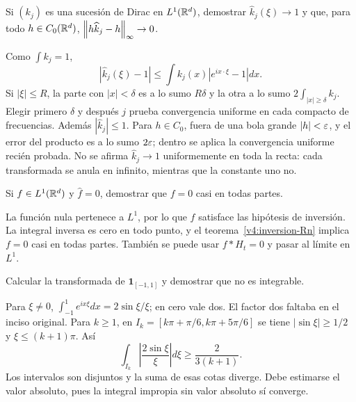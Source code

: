 \begin{ejercicio}\label{ej:v4-l10-3}
Si $(k_j)$ es una sucesión de Dirac en $L^1(\mathbb R^d)$, demostrar $\widehat k_j(\xi)\to1$ y que, para todo $h\in C_0(\mathbb R^d)$, $\left\lVert h\widehat k_j-h\right\rVert_\infty\to0$.
\end{ejercicio}
\begin{solucion}
Como $\int k_j=1$,
\[
 |\widehat k_j(\xi)-1|\leq\int k_j(x)|e^{ix\cdot\xi}-1|dx.
\]
Si $|\xi|\leq R$, la parte con $|x|<\delta$ es a lo sumo $R\delta$ y la otra a lo sumo $2\int_{|x|\geq\delta}k_j$. Elegir primero $\delta$ y después $j$ prueba convergencia uniforme en cada compacto de frecuencias. Además $|\widehat k_j|\leq1$. Para $h\in C_0$, fuera de una bola grande $|h|<\varepsilon$, y el error del producto es a lo sumo $2\varepsilon$; dentro se aplica la convergencia uniforme recién probada. No se afirma $\widehat k_j\to1$ uniformemente en toda la recta: cada transformada se anula en infinito, mientras que la constante uno no.
\end{solucion}

\begin{ejercicio}\label{ej:v4-l11-1}
Si $f\in L^1(\mathbb R^d)$ y $\widehat f=0$, demostrar que $f=0$ casi en todas partes.
\end{ejercicio}
\begin{solucion}
La función nula pertenece a $L^1$, por lo que $f$ satisface las hipótesis de inversión. La integral inversa es cero en todo punto, y el teorema~\ref{v4:inversion-Rn} implica $f=0$ casi en todas partes. También se puede usar $f*H_t=0$ y pasar al límite en $L^1$.
\end{solucion}

\begin{ejercicio}\label{ej:v4-l11-2}
Calcular la transformada de $\mathbf1_{[-1,1]}$ y demostrar que no es integrable.
\end{ejercicio}
\begin{solucion}
Para $\xi\ne0$, $\int_{-1}^1e^{ix\xi}dx=2\sin\xi/\xi$; en cero vale dos. El factor dos faltaba en el inciso original. Para $k\geq1$, en $I_k=[k\pi+\pi/6,k\pi+5\pi/6]$ se tiene $|\sin\xi|\geq1/2$ y $\xi\leq(k+1)\pi$. Así
\[
 \int_{I_k}\left|\frac{2\sin\xi}{\xi}\right|d\xi
 \geq\frac{2}{3(k+1)}.
\]
Los intervalos son disjuntos y la suma de esas cotas diverge. Debe estimarse el valor absoluto, pues la integral impropia sin valor absoluto sí converge.
\end{solucion}


